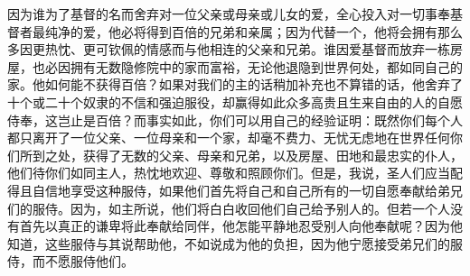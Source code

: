 因为谁为了基督的名而舍弃对一位父亲或母亲或儿女的爱，全心投入对一切事奉基督者最纯净的爱，他必将得到百倍的兄弟和亲属；因为代替一个，他将会拥有那么多因更热忱、更可钦佩的情感而与他相连的父亲和兄弟。谁因爱基督而放弃一栋房屋，也必因拥有无数隐修院中的家而富裕，无论他退隐到世界何处，都如同自己的家。他如何能不获得百倍？如果对我们的主的话稍加补充也不算错的话，他舍弃了十个或二十个奴隶的不信和强迫服役，却赢得如此众多高贵且生来自由的人的自愿侍奉，这岂止是百倍？而事实如此，你们可以用自己的经验证明：既然你们每个人都只离开了一位父亲、一位母亲和一个家，却毫不费力、无忧无虑地在世界任何你们所到之处，获得了无数的父亲、母亲和兄弟，以及房屋、田地和最忠实的仆人，他们待你们如同主人，热忱地欢迎、尊敬和照顾你们。但是，我说，圣人们应当配得且自信地享受这种服侍，如果他们首先将自己和自己所有的一切自愿奉献给弟兄们的服侍。因为，如主所说，他们将白白收回他们自己给予别人的。但若一个人没有首先以真正的谦卑将此奉献给同伴，他怎能平静地忍受别人向他奉献呢？因为他知道，这些服侍与其说帮助他，不如说成为他的负担，因为他宁愿接受弟兄们的服侍，而不愿服侍他们。\par

